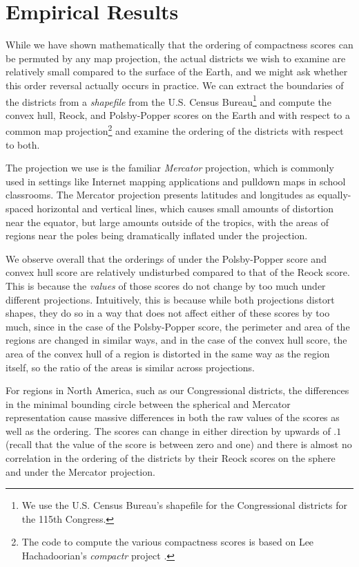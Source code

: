 
\section{Empirical Results}\label{sec:exper}




While we have shown mathematically that the ordering of compactness scores can be permuted by any map 
projection, the actual districts we wish to examine are relatively small compared to the surface of the Earth, 
and we might ask whether this order reversal actually occurs in practice.
We can extract the boundaries of the districts from a \textit{shapefile} from the U.S. Census Bureau\footnote{We use the U.S. Census Bureau's shapefile for the Congressional districts for the 115th Congress.} and compute the convex hull, Reock, and Polsby-Popper scores on the Earth and with respect to a common map projection\footnote{The code to compute the various compactness scores is based on Lee Hachadoorian's \textit{compactr} project \cite{hachadoorian2018reock}.} and examine the ordering of the districts with respect to both.

The projection we use is the familiar \textit{Mercator} projection, which is commonly used in settings like Internet mapping applications and pulldown maps in school classrooms.  The Mercator projection presents latitudes and longitudes as equally-spaced horizontal and vertical lines, which causes small amounts of distortion near the equator, but large amounts outside of the tropics, with the areas of regions near the poles being dramatically inflated under the projection.








We observe overall that the orderings of under the Polsby-Popper score and convex hull score are relatively undisturbed compared to that of the Reock score.  This is because the \textit{values} of those scores do not change by too much under different projections.  Intuitively, this is because while both projections distort shapes, they do so in a way that does not affect either of these scores by too much, since in the case of the Polsby-Popper score, the perimeter and area of the regions are changed in similar ways, and in the case of the convex hull score, the area of the convex hull of a region is distorted in the same way as the region itself, so the ratio of the areas is similar across projections.

For regions in North America, such as our Congressional districts, the differences in the minimal bounding circle between the spherical and Mercator representation cause massive differences in both the raw values of the scores as well as the ordering.  The scores can change in either direction by upwards of $.1$ (recall that the value of the score is between zero and one) and there is almost no correlation in the ordering of the districts by their Reock scores on the sphere and under the Mercator projection. 

